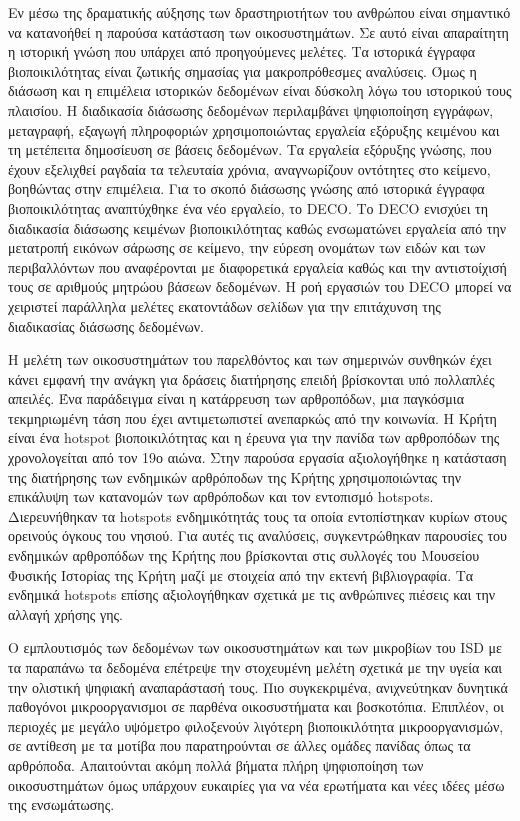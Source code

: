 \documentclass[11pt]{article}
\begin{document}
Εν μέσω της δραματικής αύξησης των δραστηριοτήτων του ανθρώπου είναι σημαντικό
να κατανοήθεί η παρούσα κατάσταση των οικοσυστημάτων. Σε αυτό είναι
απαραίτητη η ιστορική γνώση που υπάρχει από προηγούμενες μελέτες.
Τα ιστορικά έγγραφα βιοποικιλότητας είναι ζωτικής σημασίας για
μακροπρόθεσμες αναλύσεις. Όμως η διάσωση και η επιμέλεια ιστορικών δεδομένων είναι δύσκολη λόγω του ιστορικού τους
πλαισίου. Η διαδικασία διάσωσης δεδομένων περιλαμβάνει ψηφιοποίηση εγγράφων, μεταγραφή, εξαγωγή πληροφοριών
χρησιμοποιώντας εργαλεία εξόρυξης κειμένου και τη μετέπειτα δημοσίευση σε βάσεις δεδομένων.
Τα εργαλεία εξόρυξης γνώσης, που έχουν εξελιχθεί ραγδαία τα τελευταία χρόνια,
αναγνωρίζουν οντότητες στο κείμενο, βοηθώντας στην επιμέλεια.
Για το σκοπό διάσωσης γνώσης από ιστορικά έγγραφα βιοποικιλότητας
αναπτύχθηκε ένα νέο εργαλείο, το \textlatin{DECO}. 
Το \textlatin{DECO} ενισχύει τη διαδικασία διάσωσης κειμένων βιοποικιλότητας
καθώς ενσωματώνει εργαλεία από την μετατροπή εικόνων σάρωσης σε κείμενο, την 
εύρεση ονομάτων των ειδών και των περιβαλλόντων που αναφέρονται με διαφορετικά εργαλεία καθώς 
και την αντιστοίχισή τους σε αριθμούς μητρώου βάσεων δεδομένων. 
Η ροή εργασιών του \textlatin{DECO} μπορεί να χειριστεί παράλληλα μελέτες
εκατοντάδων σελίδων για την επιτάχυνση της διαδικασίας διάσωσης δεδομένων.

Η μελέτη των οικοσυστημάτων του παρελθόντος και των σημερινών συνθηκών έχει κάνει εμφανή την ανάγκη για
δράσεις διατήρησης επειδή βρίσκονται υπό πολλαπλές απειλές.
Ένα παράδειγμα είναι η κατάρρευση των αρθροπόδων, μια παγκόσμια τεκμηριωμένη
τάση που έχει αντιμετωπιστεί ανεπαρκώς από την κοινωνία.
Η Κρήτη είναι ένα \textlatin{hotspot} βιοποικιλότητας και η έρευνα για την πανίδα των αρθροπόδων της χρονολογείται από τον 19ο αιώνα.
Στην παρούσα εργασία αξιολογήθηκε η κατάσταση της διατήρησης των ενδημικών αρθρόποδων της Κρήτης χρησιμοποιώντας
την επικάλυψη των κατανομών των αρθρόποδων και τον εντοπισμό \textlatin{hotspots}.
Διερευνήθηκαν τα \textlatin{hotspots} ενδημικότητάς τους τα οποία εντοπίστηκαν κυρίων
στους ορεινούς όγκους του νησιού.
Για αυτές τις αναλύσεις, συγκεντρώθηκαν παρουσίες του ενδημικών αρθροπόδων της Κρήτης
που βρίσκονται στις συλλογές του Μουσείου Φυσικής Ιστορίας της
Κρήτη μαζί με στοιχεία από την εκτενή βιβλιογραφία.
Τα ενδημικά \textlatin{hotspots} επίσης αξιολογήθηκαν σχετικά με τις ανθρώπινες 
πιέσεις και την αλλαγή χρήσης γης.

Ο εμπλουτισμός των δεδομένων των οικοσυστημάτων και των μικροβίων του \textlatin{ISD}
με τα παραπάνω τα δεδομένα επέτρεψε την στοχευμένη μελέτη σχετικά με την υγεία και
την ολιστική ψηφιακή αναπαράστασή τους. 
Πιο συγκεκριμένα, ανιχνεύτηκαν δυνητικά παθογόνοι μικροοργανισμοι σε
παρθένα οικοσυστήματα και βοσκοτόπια.
Επιπλέον, οι περιοχές με μεγάλο υψόμετρο φιλοξενούν λιγότερη βιοποικιλότητα
μικροοργανισμών, σε αντίθεση με τα μοτίβα που παρατηρούνται σε άλλες ομάδες πανίδας όπως τα αρθρόποδα.
Απαιτούνται ακόμη πολλά βήματα πλήρη ψηφιοποίηση των οικοσυστημάτων
όμως υπάρχουν ευκαιρίες για να νέα ερωτήματα και νέες ιδέες
μέσω της ενσωμάτωσης.
\end{document}
